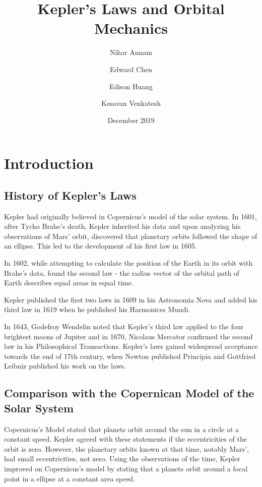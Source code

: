 \documentclass[11pt]{article}
\title{Kepler's Laws and Orbital Mechanics}
\author{Nihar Annam \and Edward Chen \and Edison Huang \and Kesavan Venkatesh}
\date{December 2019}
\theoremstyle{definition}
\begin{document}
\maketitle


\section{Introduction}\label{section-introduction}
\subsection{History of Kepler's Laws}
Kepler had originally believed in Copernicus's model of the solar system. In 1601, after Tycho Brahe's death, Kepler inherited his data and upon analyzing his observations of Mars' orbit, discovered that planetary orbits followed the shape of an ellipse. This led to the development of his first law in 1605.

In 1602, while attempting to calculate the position of the Earth in its orbit with Brahe's data, found the second law - the radius vector of the orbital path of Earth describes equal areas in equal time.

Kepler published the first two laws in 1609 in his Astronomia Nova and added his third law in 1619 when he published his Harmonices Mundi.

In 1643, Godefroy Wendelin noted that Kepler's third law applied to the four brightest moons of Jupiter and in 1670, Nicolaus Mercator confirmed the second law in his Philosophical Transactions. Kepler's laws gained widespread acceptance towards the end of 17th century, when Newton published Principia and Gottfried Leibniz published his work on the laws. 

\subsection{Comparison with the Copernican Model of the Solar System}
Copernicus's Model stated that planets orbit around the sun in a circle at a constant speed. 
Kepler agreed with these statements if the eccentricities of the orbit is zero. However, the planetary orbits known at that time, notably Mars', had small eccentricities, not zero. Using the observations of the time, Kepler improved on Copernicus's model by stating that a planets orbit around a focal point in a ellipse at a constant area speed.
\end{document}
